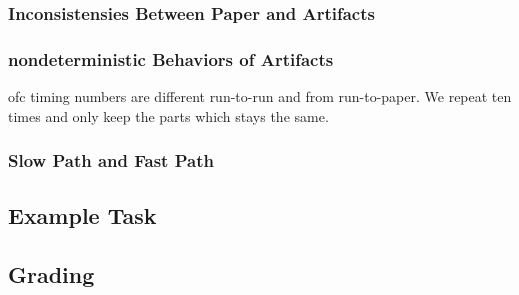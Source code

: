 \subsubsection{Inconsistensies Between Paper and Artifacts}
\label{s:inconsistencies}

\subsubsection{nondeterministic Behaviors of Artifacts}
\label{s:nondeterminism}

ofc timing numbers are different run-to-run and from run-to-paper.
We repeat ten times and only keep the parts which stays the same.

\subsubsection{Slow Path and Fast Path}
\label{s:slow_and_fast}

\subsection{Example Task}
\label{s:task_example}


\subsection{Grading}
\label{s:grading}

